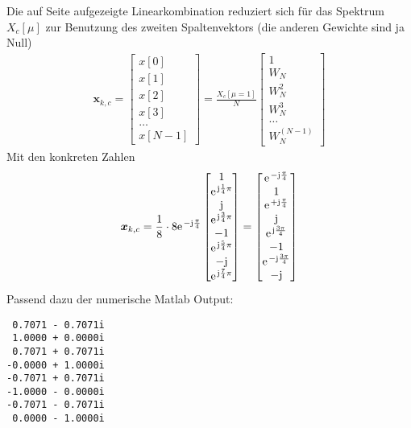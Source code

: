 \begin{ExCalc}
Die auf Seite \pageref{LinComb_for_IDFT} aufgezeigte Linearkombination reduziert
sich für das Spektrum $X_c[\mu]$ zur Benutzung des zweiten Spaltenvektors (die
anderen Gewichte sind ja Null)
\begin{align*}
\bm{x}_{k,c}=
\begin{bmatrix}
x[0]\\[1em]
x[1]\\[1em]
x[2]\\[1em]
x[3]\\[1em]
\dots\\[1em]
x[N-1]
\end{bmatrix}
=
\frac{X_c[\mu=1]}{N}
\begin{bmatrix}
1\\[1em]
W_N\\[1em]
W_N^2\\[1em]
W_N^3\\[1em]
\dots\\[1em]
W_N^{(N-1)}
\end{bmatrix}
\end{align*}
Mit den konkreten Zahlen
\begin{align}
\bm{x}_{k,c} = \frac{1}{8} \cdot 8 \e^{-\im\frac{\pi}{4}}
\begin{bmatrix}
1 \\  \e^{\im\frac{1}{4}\pi} \\ \im \\ \e^{\im\frac{3}{4}\pi}  \\ -1 \\ \e^{\im\frac{5}{4}\pi} \\ -\im \\ \e^{\im\frac{7}{4}\pi}
\end{bmatrix}=
\begin{bmatrix}
\e^{-\im\frac{\pi}{4}}\\
1\\
\e^{+\im\frac{\pi}{4}}\\
\im\\
\e^{\im\frac{3\pi}{4}}\\
-1\\
\e^{-\im\frac{3\pi}{4}}\\
-\im
\end{bmatrix}
\end{align}
Passend dazu der numerische Matlab Output:
\begin{verbatim}
 0.7071 - 0.7071i
 1.0000 + 0.0000i
 0.7071 + 0.7071i
-0.0000 + 1.0000i
-0.7071 + 0.7071i
-1.0000 - 0.0000i
-0.7071 - 0.7071i
 0.0000 - 1.0000i
\end{verbatim}

\end{ExCalc}
